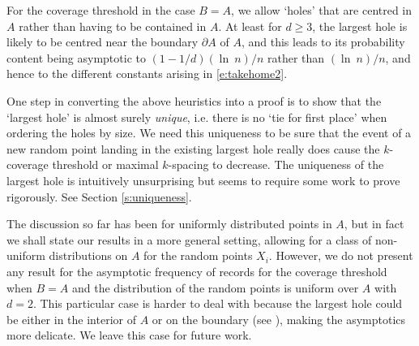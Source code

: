 \documentclass[12pt]{article}
\newcommand{\X}{\mathcal{X}}
\newcommand{\R}{\mathbb{R}}
\renewcommand{\log}{{\ln \:}}
\begin{document}
 For the coverage threshold
 in the case $B=A$, we allow `holes' that are centred 
 in $A$ rather than having to be contained in $A$.  
 At least for $d \geq 3$, the largest hole is likely to be centred
 near the boundary $\partial A$ of $A$,
 and this leads to its probability content being
 asymptotic to $(1-1/d) (\log n)/n$ rather than $(\log n)/n$, and hence to the different constants arising in \eqref{e:takehome2}.

 One step  in converting the above heuristics into a proof is to show
 that the `largest hole' is almost surely {\em unique}, i.e. there
 is no `tie for first place' when ordering the holes by size.
 We need this uniqueness to be sure that the event of a new random point landing in the existing largest hole really
 does cause the $k$-coverage threshold or maximal $k$-spacing to decrease. 
 The uniqueness of the largest hole is   
 intuitively unsurprising but seems to require some work to prove rigorously. 
 See Section \ref{s:uniqueness}.

 The discussion so far  has been for uniformly distributed points in $A$,
 but in fact we shall state our results in a more general setting, allowing
 for a class of non-uniform distributions on $A$ for the random points $X_i$.
 However, we do not present any result for the asymptotic frequency 
 of records for the coverage threshold when $B=A$ and  
 the distribution of the random points is uniform over $A$ with $d=2$.
 This particular case is harder to deal with because the largest hole
 could be either in the interior of $A$ or on the boundary
 (see \cite{MPCov}), making
 the asymptotics more delicate. We leave this case for future work.



\end{document}
